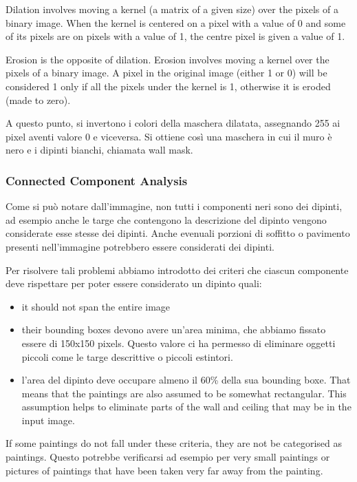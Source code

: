 \documentclass[10pt,twocolumn,letterpaper]{article}
\begin{document}
Dilation involves moving a kernel (a matrix of a given size) over the pixels of a binary image. When the kernel is centered on a pixel with a value of 0 and some of its pixels are on pixels with a value of 1, the centre pixel is given a value of 1.

Erosion is the opposite of dilation. Erosion involves moving a kernel over the pixels of a binary image. A pixel in the original image (either 1 or 0) will be considered 1 only if all the pixels under the kernel is 1, otherwise it is eroded (made to zero).

A questo punto, si invertono i colori della maschera dilatata, assegnando 255 ai pixel aventi valore 0 e viceversa. Si ottiene così una maschera in cui il muro è nero e i dipinti bianchi, chiamata wall mask.

\subsubsection{Connected Component Analysis}

Come si può notare dall'immagine, non tutti i componenti neri sono dei dipinti, ad esempio anche le targe che contengono la descrizione del dipinto vengono considerate esse stesse dei dipinti. Anche evenuali porzioni di soffitto o pavimento presenti nell'immagine potrebbero essere considerati dei dipinti. 

Per risolvere tali problemi abbiamo introdotto dei criteri che ciascun componente deve rispettare per poter essere considerato un dipinto quali:
\begin{itemize}
   \item it should not span the entire image
   \item their bounding boxes devono avere un'area minima, che abbiamo fissato essere di 150x150 pixels. Questo valore ci ha permesso di eliminare oggetti piccoli come le targe descrittive o piccoli estintori.
   \item l'area del dipinto deve occupare almeno il 60\% della sua bounding boxe. That means that the paintings are also assumed to be somewhat rectangular. This assumption helps to eliminate parts of the wall and ceiling that may be in the input image.
\end{itemize}

If some paintings do not fall under these criteria, they are not be categorised as paintings. Questo potrebbe verificarsi ad esempio per very small paintings or pictures of paintings that have been taken very far away from the painting.
\end{document}
